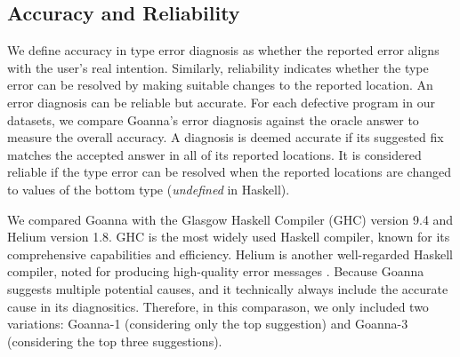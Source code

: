 \documentclass[pdflatex,sn-nature,Numbered]{sn-jnl}%
\begin{document}
\subsection{Accuracy and Reliability} \label{sub:eval-accuracy}

We define accuracy in type error diagnosis as whether the reported error aligns with the user's real intention. Similarly, reliability indicates whether the type error can be resolved by making suitable changes to the reported location. An error diagnosis can be reliable but accurate. For each defective program in our datasets, we compare Goanna's error diagnosis against the oracle answer to measure the overall accuracy. A diagnosis is deemed accurate if its suggested fix matches the accepted answer in all of its reported locations. It is considered reliable if the type error can be resolved when the reported locations are changed to values of the bottom type (\textit{undefined} in Haskell).

We compared Goanna with the Glasgow Haskell Compiler (GHC) version 9.4 \cite{Gamari_undated-zu} and Helium \cite{Hage2023-kk} version 1.8. GHC is the most widely used Haskell compiler, known for its comprehensive capabilities and efficiency. Helium is another well-regarded Haskell compiler, noted for producing high-quality error messages \cite{Heeren2003-kd}. Because Goanna suggests multiple potential causes, and it technically always include the accurate cause in its diagnositics. Therefore, in this comparason, we only included two variations: Goanna-1 (considering only the top suggestion) and Goanna-3 (considering the top three suggestions).
\end{document}
